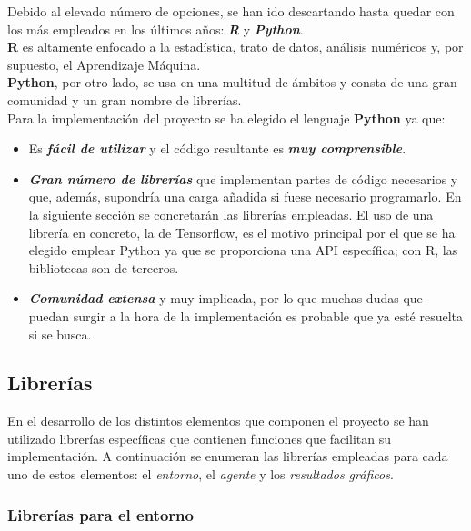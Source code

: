 Debido al elevado número de opciones, se han ido descartando hasta quedar con los más empleados en los últimos años: \textbf{\textit{R}} y \textbf{\textit{Python}}. \\

\textbf{R} es altamente enfocado a la estadística, trato de datos, análisis numéricos y, por supuesto, el Aprendizaje Máquina. \\

\textbf{Python}, por otro lado, se usa en una multitud de ámbitos y consta de una gran comunidad y un gran nombre de librerías. \\

Para la implementación del proyecto se ha elegido el lenguaje \textbf{Python} ya que:

\begin{itemize}
    \item Es \textbf{\textit{fácil de utilizar}} y el código resultante es \textbf{\textit{muy comprensible}}.
    \item \textbf{\textit{Gran número de librerías}} que implementan partes de código necesarios y que, además, supondría una carga añadida si fuese necesario programarlo. En la siguiente sección se concretarán las librerías empleadas. El uso de una librería en concreto, la de Tensorflow, es el motivo principal por el que se ha elegido emplear Python ya que se proporciona una API específica; con R, las bibliotecas son de terceros. 
    \item \textbf{\textit{Comunidad extensa}} y muy implicada, por lo que muchas dudas que puedan surgir a la hora de la implementación es probable que ya esté resuelta si se busca.
\end{itemize}

\subsection{Librerías} 

En el desarrollo de los distintos elementos que componen el proyecto se han utilizado librerías específicas que contienen funciones que facilitan su implementación. A continuación se enumeran las librerías empleadas para cada uno de estos elementos: el \textit{entorno}, el \textit{agente} y los \textit{resultados gráficos}. 

\subsubsection{Librerías para el entorno}

